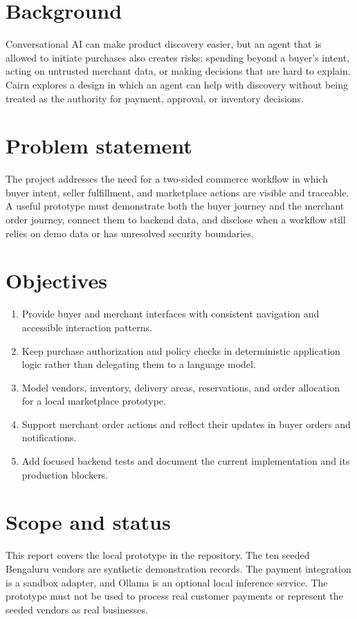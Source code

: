 \documentclass[12pt,a4paper]{report}
\begin{document}
\section{Background}
Conversational AI can make product discovery easier, but an agent that is
allowed to initiate purchases also creates risks: spending beyond a buyer's
intent, acting on untrusted merchant data, or making decisions that are hard to
explain. Cairn explores a design in which an agent can help with discovery
without being treated as the authority for payment, approval, or inventory
decisions.

\section{Problem statement}
The project addresses the need for a two-sided commerce workflow in which
buyer intent, seller fulfillment, and marketplace actions are visible and
traceable. A useful prototype must demonstrate both the buyer journey and the
merchant order journey, connect them to backend data, and disclose when a
workflow still relies on demo data or has unresolved security boundaries.

\section{Objectives}
\begin{enumerate}
  \item Provide buyer and merchant interfaces with consistent navigation and
        accessible interaction patterns.
  \item Keep purchase authorization and policy checks in deterministic
        application logic rather than delegating them to a language model.
  \item Model vendors, inventory, delivery areas, reservations, and order
        allocation for a local marketplace prototype.
  \item Support merchant order actions and reflect their updates in buyer
        orders and notifications.
  \item Add focused backend tests and document the current implementation and
        its production blockers.
\end{enumerate}

\section{Scope and status}
This report covers the local prototype in the repository. The ten seeded
Bengaluru vendors are synthetic demonstration records. The payment integration
is a sandbox adapter, and Ollama is an optional local inference service. The
prototype must not be used to process real customer payments or represent the
seeded vendors as real businesses.
\end{document}
